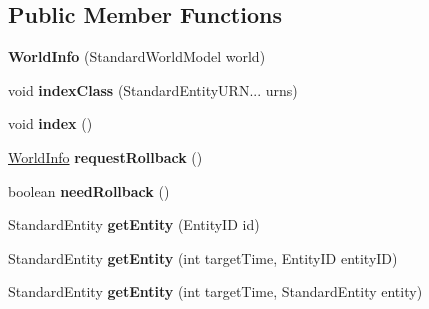 \subsection*{Public Member Functions}
\begin{DoxyCompactItemize}
\item 
\hypertarget{classadf_1_1agent_1_1info_1_1WorldInfo_af2e76c5ecc9ae11756e12f370a630f5d}{}\label{classadf_1_1agent_1_1info_1_1WorldInfo_af2e76c5ecc9ae11756e12f370a630f5d} 
{\bfseries World\+Info} (Standard\+World\+Model world)
\item 
\hypertarget{classadf_1_1agent_1_1info_1_1WorldInfo_a295ba9da2d5d52c0133e8dda46354e68}{}\label{classadf_1_1agent_1_1info_1_1WorldInfo_a295ba9da2d5d52c0133e8dda46354e68} 
void {\bfseries index\+Class} (Standard\+Entity\+U\+R\+N... urns)
\item 
\hypertarget{classadf_1_1agent_1_1info_1_1WorldInfo_a373b42e6c2fc1deab8963ee63c97a8e1}{}\label{classadf_1_1agent_1_1info_1_1WorldInfo_a373b42e6c2fc1deab8963ee63c97a8e1} 
void {\bfseries index} ()
\item 
\hypertarget{classadf_1_1agent_1_1info_1_1WorldInfo_a2c65bcb041b80e7d4ddb46156935ef1b}{}\label{classadf_1_1agent_1_1info_1_1WorldInfo_a2c65bcb041b80e7d4ddb46156935ef1b} 
\hyperlink{classadf_1_1agent_1_1info_1_1WorldInfo}{World\+Info} {\bfseries request\+Rollback} ()
\item 
\hypertarget{classadf_1_1agent_1_1info_1_1WorldInfo_a1e1b2688e4a439a93b7ac5e1a0555ca8}{}\label{classadf_1_1agent_1_1info_1_1WorldInfo_a1e1b2688e4a439a93b7ac5e1a0555ca8} 
boolean {\bfseries need\+Rollback} ()
\item 
\hypertarget{classadf_1_1agent_1_1info_1_1WorldInfo_aab4f629458f301ce51f5384bd740f0ff}{}\label{classadf_1_1agent_1_1info_1_1WorldInfo_aab4f629458f301ce51f5384bd740f0ff} 
Standard\+Entity {\bfseries get\+Entity} (Entity\+ID id)
\item 
\hypertarget{classadf_1_1agent_1_1info_1_1WorldInfo_a0d02585d36eb96ac2ae568e3a171a91b}{}\label{classadf_1_1agent_1_1info_1_1WorldInfo_a0d02585d36eb96ac2ae568e3a171a91b} 
Standard\+Entity {\bfseries get\+Entity} (int target\+Time, Entity\+ID entity\+ID)
\item 
\hypertarget{classadf_1_1agent_1_1info_1_1WorldInfo_a445145db6e9e050040c66435f66626ef}{}\label{classadf_1_1agent_1_1info_1_1WorldInfo_a445145db6e9e050040c66435f66626ef} 
Standard\+Entity {\bfseries get\+Entity} (int target\+Time, Standard\+Entity entity)
\item 
\hypertarget{classadf_1_1agent_1_1info_1_1WorldInfo_aff90f52ae10170804ee2f45526d54c12}{}\label{classadf_1_1agent_1_1info_1_1WorldInfo_aff90f52ae10170804ee2f45526d54c12} 

\end{DoxyCompactItemize}

